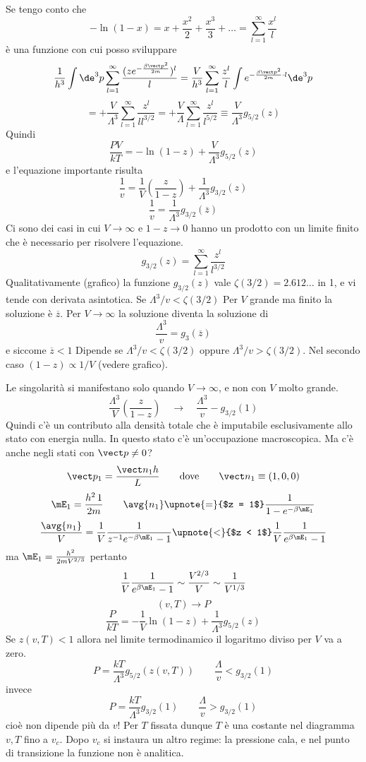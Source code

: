 Se tengo conto che
\[
- \ln(1 - x) = x + \frac{x^2}{2} + \frac{x^3}{3} + \dots = \sum_{l = 1}^\infty \frac{x^l}{l}
\]
è una funzione con cui posso sviluppare
\[
\frac{1}{h^3} \int \de^3 p \sum_{l = 1}^\infty \frac{(z e^{-\frac{\beta \vect p^2}{2 m}})^l}{l} = \frac{V}{h^3} \sum_{l = 1}^\infty \frac{z^l}{l} \int e^{-\frac{\beta \vect p^2}{2m} \cdot l} \de^3 p
\]
\[
= + \frac{V}{\Lambda^3} \sum_{l = 1}^\infty \frac{z^l}{l l^{3/2}} = + \frac{V}{\Lambda} \sum_{l = 1}^\infty \frac{z^l}{l^{5/2}} \equiv \frac{V}{\Lambda^3} g_{5/2}(z)
\]
Quindi
\[
\frac{P V}{k T} = - \ln(1 - z) + \frac{V}{\Lambda^3} g_{5/2}(z)
\]
e l'equazione importante risulta
\[
\frac{1}{v} = \frac{1}{V} \left(\frac{z}{1 -z}\right) + \frac{1}{\Lambda^3} g_{3/2}(z)
\]
\[
\frac{1}{v} = \frac{1}{\Lambda^3} g_{3/2}(\overline z)
\]
Ci sono dei casi in cui $V \to \infty$ e $1 - z \to 0$ hanno un prodotto con un limite finito che è necessario per risolvere l'equazione.
\[
g_{3/2}(z) = \sum_{l = 1}^\infty \frac{z^l}{l^{3/2}}
\]
Qualitativamente (grafico) la funzione $g_{3/2}(z)$ vale $\zeta(3/2) = 2.612\dots$ in 1, e vi tende con derivata asintotica. Se $\Lambda^3/v < \zeta(3/2)$ Per $V$ grande ma finito la soluzione è $\overline z$. Per $V \to \infty$ la soluzione diventa la soluzione di
\[
\frac{\Lambda^3}{v} = g_3(\overline z)
\]
e siccome $\overline z < 1$
Dipende se $\Lambda^3/v < \zeta(3/2)$ oppure $\Lambda^3/v > \zeta(3/2)$. Nel secondo caso $(1 - z) \propto 1/V$ (vedere grafico).

Le singolarità si manifestano solo quando $V \to \infty$, e non con $V$ molto grande.
\[
\frac{\Lambda^3}{V} \left(\frac{z}{1 - z}\right) \quad \longrightarrow \quad \frac{\Lambda^3}{v} - g_{3/2}(1)
\]
Quindi c'è un contributo alla densità totale che è imputabile esclusivamente allo stato con energia nulla. In questo stato c'è un'occupazione macroscopica. Ma c'è anche negli stati con $\vect p \neq 0$?
\[
\vect p_1 = \frac{\vect n_1 h}{L} \qquad \text{dove} \qquad \vect n_1 \equiv (1,0,0)
\]
\[
\mE_1 = \frac{h^2 \, 1}{2 m} \qquad \avg{n_1} \upnote{=}{$z = 1$} \frac{1}{1 - e^{-\beta \mE_1}} 
\]
\[
\frac{\avg{n_1}}{V} = \frac{1}{V} \frac{1}{z^{-1} e^{-\beta \mE_1} - 1} \upnote{<}{$z < 1$} \frac{1}{V} \frac{1}{e^{\beta \mE_1} - 1} 
\]
ma $\mE_1 = \frac{h^2}{2 m V^{2/3}}$ pertanto
\[
\frac{1}{V} \frac{1}{e^{\beta \mE_1} - 1} \sim \frac{V^{2/3}}{V} \sim \frac{1}{V^{1/3}}
\]
\[
(v,T) \to P
\]
\[
\frac{P}{k T} = - \frac{1}{V} \ln(1 - z) + \frac{1}{\Lambda^3} g_{5/2}(z)
\]
Se $z(v,T) < 1$ allora nel limite termodinamico il logaritmo diviso per $V$ va a zero.
\[
P = \frac{k T}{\Lambda^3} g_{5/2}(z(v,T)) \qquad \frac{\Lambda}{v} < g_{3/2}(1)
\]
invece
\[
P = \frac{k T}{\Lambda^3} g_{3/2}(1) \qquad \frac{\Lambda}{v} > g_{3/2}(1)
\]
cioè non dipende più da $v$! Per $T$ fissata dunque $T$ è una costante nel diagramma $v,T$ fino a $v_c$. Dopo $v_c$ si instaura un altro regime: la pressione cala, e nel punto di transizione la funzione non è analitica.



